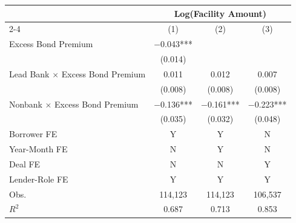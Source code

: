 {
\def\sym#1{\ifmmode^{#1}\else\(^{#1}\)\fi}
\begin{tabular}{l*{3}{c}}
\toprule\toprule
                                        &\multicolumn{3}{c}{Log(Facility Amount)}       \\\cmidrule(lr){2-4}
                                        &\multicolumn{1}{c}{(1)}   &\multicolumn{1}{c}{(2)}   &\multicolumn{1}{c}{(3)}   \\
\toprule
Excess Bond Premium                     &    $-$0.043***&               &               \\
                                        &     (0.014)   &               &               \\
[1em]
Lead Bank $\times$ Excess Bond Premium  &       0.011   &       0.012   &       0.007   \\
                                        &     (0.008)   &     (0.008)   &     (0.008)   \\
[1em]
Nonbank $\times$ Excess Bond Premium    &    $-$0.136***&    $-$0.161***&    $-$0.223***\\
                                        &     (0.035)   &     (0.032)   &     (0.048)   \\
\toprule
Borrower FE                             &           Y   &           Y   &           N   \\
Year-Month FE                           &           N   &           Y   &           N   \\
Deal FE                                 &           N   &           N   &           Y   \\
Lender-Role FE                          &           Y   &           Y   &           Y   \\
Obs.                                    &     114,123   &     114,123   &     106,537   \\
$R^2$                                   &       0.687   &       0.713   &       0.853   \\
\toprule\toprule
\end{tabular}
}
